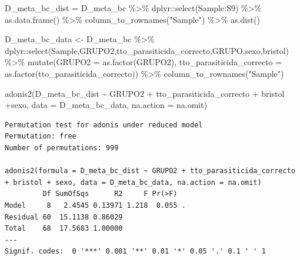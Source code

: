 \documentclass[
  letterpaper,
  DIV=11,
  numbers=noendperiod]{scrartcl}
\newenvironment{Shaded}{\begin{snugshade}}{\end{snugshade}}
\newcommand{\AttributeTok}[1]{\textcolor[rgb]{0.40,0.45,0.13}{#1}}
\newcommand{\FunctionTok}[1]{\textcolor[rgb]{0.28,0.35,0.67}{#1}}
\newcommand{\NormalTok}[1]{\textcolor[rgb]{0.00,0.23,0.31}{#1}}
\newcommand{\OtherTok}[1]{\textcolor[rgb]{0.00,0.23,0.31}{#1}}
\newcommand{\SpecialCharTok}[1]{\textcolor[rgb]{0.37,0.37,0.37}{#1}}
\newcommand{\StringTok}[1]{\textcolor[rgb]{0.13,0.47,0.30}{#1}}
\begin{document}
\begin{Shaded}
\begin{Highlighting}[]
\NormalTok{D\_meta\_bc\_dist }\OtherTok{=}\NormalTok{ D\_meta\_bc }\SpecialCharTok{\%\textgreater{}\%} 
\NormalTok{  dplyr}\SpecialCharTok{::}\FunctionTok{select}\NormalTok{(Sample}\SpecialCharTok{:}\NormalTok{S9) }\SpecialCharTok{\%\textgreater{}\%} 
  \FunctionTok{as.data.frame}\NormalTok{() }\SpecialCharTok{\%\textgreater{}\%} 
  \FunctionTok{column\_to\_rownames}\NormalTok{(}\StringTok{"Sample"}\NormalTok{) }\SpecialCharTok{\%\textgreater{}\%} 
  \FunctionTok{as.dist}\NormalTok{()}

\NormalTok{D\_meta\_bc\_data }\OtherTok{\textless{}{-}}\NormalTok{ D\_meta\_bc }\SpecialCharTok{\%\textgreater{}\%} 
\NormalTok{  dplyr}\SpecialCharTok{::}\FunctionTok{select}\NormalTok{(Sample,GRUPO2,tto\_parasiticida\_correcto,GRUPO,sexo,bristol) }\SpecialCharTok{\%\textgreater{}\%} 
  \FunctionTok{mutate}\NormalTok{(}\AttributeTok{GRUPO2 =} \FunctionTok{as.factor}\NormalTok{(GRUPO2),}
         \AttributeTok{tto\_parasiticida\_correcto =} \FunctionTok{as.factor}\NormalTok{(tto\_parasiticida\_correcto)) }\SpecialCharTok{\%\textgreater{}\%} \FunctionTok{column\_to\_rownames}\NormalTok{(}\StringTok{"Sample"}\NormalTok{)}

\FunctionTok{adonis2}\NormalTok{(D\_meta\_bc\_dist }\SpecialCharTok{\textasciitilde{}}\NormalTok{ GRUPO2 }\SpecialCharTok{+}\NormalTok{ tto\_parasiticida\_correcto }\SpecialCharTok{+}\NormalTok{ bristol }\SpecialCharTok{+}\NormalTok{sexo, }\AttributeTok{data =}\NormalTok{ D\_meta\_bc\_data, }\AttributeTok{na.action =}\NormalTok{ na.omit)}
\end{Highlighting}
\end{Shaded}

\begin{verbatim}
Permutation test for adonis under reduced model
Permutation: free
Number of permutations: 999

adonis2(formula = D_meta_bc_dist ~ GRUPO2 + tto_parasiticida_correcto + bristol + sexo, data = D_meta_bc_data, na.action = na.omit)
         Df SumOfSqs      R2     F Pr(>F)  
Model     8   2.4545 0.13971 1.218  0.055 .
Residual 60  15.1138 0.86029               
Total    68  17.5683 1.00000               
---
Signif. codes:  0 '***' 0.001 '**' 0.01 '*' 0.05 '.' 0.1 ' ' 1
\end{verbatim}

\begin{Shaded}
\end{Shaded}
\end{document}
